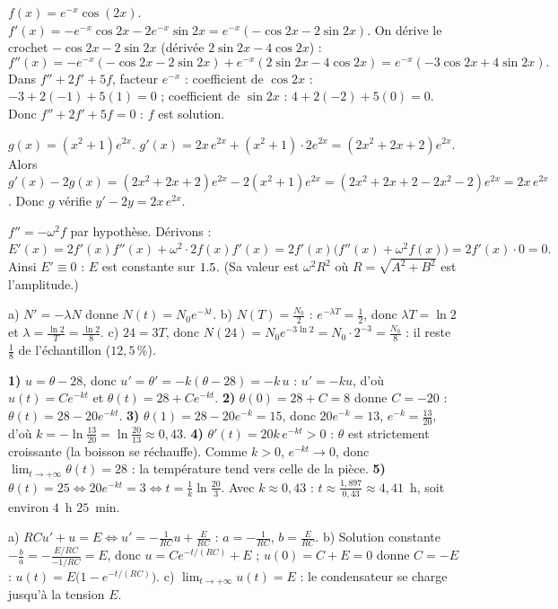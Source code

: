 $f(x)=e^{-x}\cos(2x)$.
$f'(x)=-e^{-x}\cos 2x-2e^{-x}\sin 2x=e^{-x}(-\cos 2x-2\sin 2x)$.
On dérive le crochet $-\cos2x-2\sin2x$ (dérivée $2\sin2x-4\cos2x$) :
\[
f''(x)=-e^{-x}(-\cos2x-2\sin2x)+e^{-x}(2\sin2x-4\cos2x)=e^{-x}(-3\cos2x+4\sin2x).
\]
Dans $f''+2f'+5f$, facteur $e^{-x}$ :
coefficient de $\cos2x$ : $-3+2(-1)+5(1)=0$ ;
coefficient de $\sin2x$ : $4+2(-2)+5(0)=0$.
Donc $f''+2f'+5f=0$ : $f$ est solution.

$g(x)=(x^2+1)e^{2x}$. $g'(x)=2x\,e^{2x}+(x^2+1)\cdot 2e^{2x}=(2x^2+2x+2)e^{2x}$.
Alors $g'(x)-2g(x)=(2x^2+2x+2)e^{2x}-2(x^2+1)e^{2x}=(2x^2+2x+2-2x^2-2)e^{2x}
=2x\,e^{2x}$. Donc $g$ vérifie $y'-2y=2x\,e^{2x}$.

$f''=-\omega^2 f$ par hypothèse. Dérivons :
$E'(x)=2f'(x)f''(x)+\omega^2\cdot 2f(x)f'(x)=2f'(x)\big(f''(x)+\omega^2 f(x)\big)
=2f'(x)\cdot 0=0.$
Ainsi $E'\equiv 0$ : $E$ est constante sur $1.5$. (Sa valeur est $\omega^2 R^2$
où $R=\sqrt{A^2+B^2}$ est l'amplitude.)

a) $N'=-\lambda N$ donne $N(t)=N_0e^{-\lambda t}$.\;
b) $N(T)=\frac{N_0}{2}$ : $e^{-\lambda T}=\frac12$, donc $\lambda T=\ln2$ et
$\lambda=\frac{\ln2}{T}=\frac{\ln2}{8}$.\;
c) $24=3T$, donc $N(24)=N_0e^{-3\ln2}=N_0\cdot 2^{-3}=\frac{N_0}{8}$ : il reste
$\frac18$ de l'échantillon ($12{,}5\,\%$).

\textbf{1)} $u=\theta-28$, donc $u'=\theta'=-k(\theta-28)=-k\,u$ : $u'=-ku$, d'où
$u(t)=Ce^{-kt}$ et $\theta(t)=28+Ce^{-kt}$.\;
\textbf{2)} $\theta(0)=28+C=8$ donne $C=-20$ : $\theta(t)=28-20e^{-kt}$.\;
\textbf{3)} $\theta(1)=28-20e^{-k}=15$, donc $20e^{-k}=13$, $e^{-k}=\frac{13}{20}$,
d'où $k=-\ln\frac{13}{20}=\ln\frac{20}{13}\approx 0{,}43$.\;
\textbf{4)} $\theta'(t)=20k\,e^{-kt}>0$ : $\theta$ est strictement croissante (la
boisson se réchauffe). Comme $k>0$, $e^{-kt}\to0$, donc
$\displaystyle\lim_{t\to+\infty}\theta(t)=28$ : la température tend vers celle de la
pièce.\;
\textbf{5)} $\theta(t)=25 \Leftrightarrow 20e^{-kt}=3 \Leftrightarrow
t=\frac{1}{k}\ln\frac{20}{3}$. Avec $k\approx0{,}43$ :
$t\approx\frac{1{,}897}{0{,}43}\approx 4{,}41$~h, soit environ $4$~h $25$~min.

a) $RCu'+u=E \Leftrightarrow u'=-\frac{1}{RC}u+\frac{E}{RC}$ : $a=-\frac{1}{RC}$,
$b=\frac{E}{RC}$.\;
b) Solution constante $-\frac ba=-\frac{E/RC}{-1/RC}=E$, donc $u=Ce^{-t/(RC)}+E$ ;
$u(0)=C+E=0$ donne $C=-E$ : $u(t)=E\big(1-e^{-t/(RC)}\big)$.\;
c) $\displaystyle\lim_{t\to+\infty}u(t)=E$ : le condensateur se charge jusqu'à la
tension $E$.

